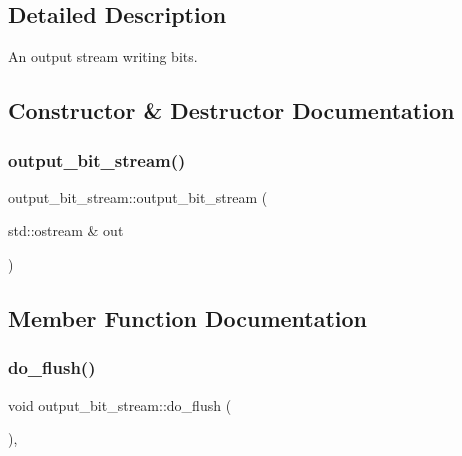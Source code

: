 \subsection{Detailed Description}
An output stream writing bits. 

\subsection{Constructor \& Destructor Documentation}
\mbox{\label{classoutput__bit__stream_a5d493954dacb0de700a55d35d094b153}} 
\subsubsection{\texorpdfstring{output\+\_\+bit\+\_\+stream()}{output\_bit\_stream()}}
{\footnotesize\ttfamily output\+\_\+bit\+\_\+stream\+::output\+\_\+bit\+\_\+stream (\begin{DoxyParamCaption}\item[{std\+::ostream \&}]{out }\end{DoxyParamCaption})\hspace{0.3cm}{\ttfamily [inline]}}



\subsection{Member Function Documentation}
\mbox{\label{classoutput__bit__stream_a588daa77b98d61eaec7a5a34ee4005b3}} 
\subsubsection{\texorpdfstring{do\+\_\+flush()}{do\_flush()}}
{\footnotesize\ttfamily void output\+\_\+bit\+\_\+stream\+::do\+\_\+flush (\begin{DoxyParamCaption}{ }\end{DoxyParamCaption})\hspace{0.3cm}{\ttfamily [inline]}, {\ttfamily [protected]}}

